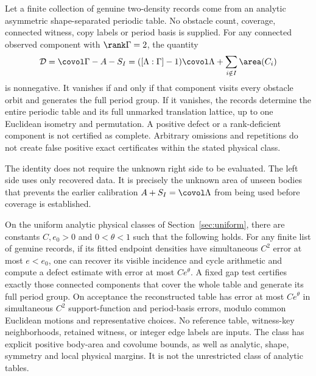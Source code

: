 \begin{theorem}
\label{thm:completion-main}
Let a finite collection of genuine two-density records come from an
analytic asymmetric shape-separated periodic table. No obstacle count,
coverage, connected witness, copy labels or period basis is supplied.
For any connected observed component with $\rank\Gamma=2$, the
quantity
\begin{equation}\label{eq:defect-main}
 \mathcal D=\covol\Gamma-A-S_I
       =([\Lambda:\Gamma]-1)\covol\Lambda
                         +\sum_{i\notin I}\area(C_i)
\end{equation}
is nonnegative. It vanishes if and only if that component visits every
obstacle orbit and generates the full period group. If it vanishes,
the records determine the entire periodic table and its full unmarked
translation lattice, up to one Euclidean isometry and permutation.
A positive defect or a rank-deficient component is not certified as
complete. Arbitrary omissions and repetitions do not create false
positive exact certificates within the stated physical class.
\end{theorem}

The identity does not require the unknown right side to be evaluated.
The left side uses only recovered data. It is precisely the unknown
area of unseen bodies that prevents the earlier calibration
$A+S_I=\covol\Lambda$ from being used before coverage is established.

\begin{theorem}\label{thm:uniform-main}
On the uniform analytic physical classes of Section~\ref{sec:uniform},
there are constants $C,e_0>0$ and $0<\theta<1$ such that the following
holds. For any finite list of genuine records, if its fitted endpoint
densities have simultaneous $C^2$ error at most $e<e_0$, one can recover
its visible incidence and cycle arithmetic and compute a defect estimate
with error at most $Ce^\theta$. A fixed gap test certifies exactly those
connected components that cover the whole table and generate its full
period group. On acceptance the reconstructed table has error at most
$Ce^\theta$ in simultaneous $C^2$ support-function and period-basis errors, modulo
common Euclidean motions and representative choices.
No reference table, witness-key neighborhoods, retained witness, or
integer edge labels are inputs. The class has explicit positive body-area
and covolume bounds, as well as analytic, shape, symmetry and local
physical margins. It is not the unrestricted class of analytic tables.
\end{theorem}

